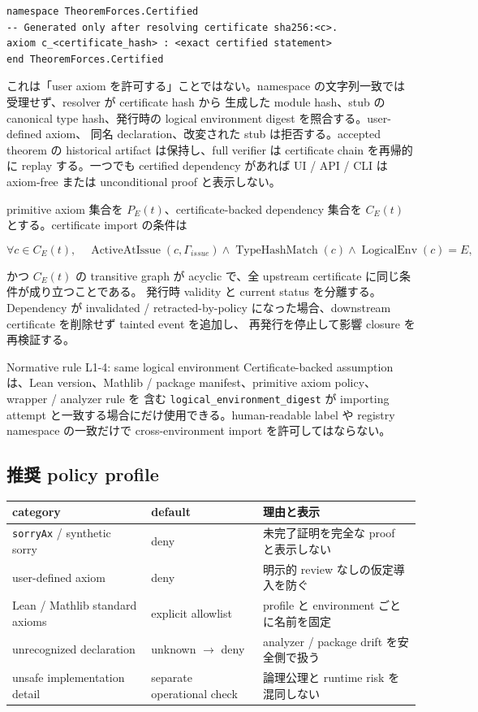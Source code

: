\documentclass[a4paper,11pt]{ltjsarticle}
\newcommand{\code}[1]{\texttt{#1}}
\begin{document}
\begin{lstlisting}
namespace TheoremForces.Certified
-- Generated only after resolving certificate sha256:<c>.
axiom c_<certificate_hash> : <exact certified statement>
end TheoremForces.Certified
\end{lstlisting}

これは「user axiom を許可する」ことではない。namespace の文字列一致では受理せず、resolver が certificate hash から
生成した module hash、stub の canonical type hash、発行時の logical environment digest を照合する。user-defined axiom、
同名 declaration、改変された stub は拒否する。accepted theorem の historical artifact は保持し、full verifier は
certificate chain を再帰的に replay する。一つでも certified dependency があれば UI / API / CLI は axiom-free または
unconditional proof と表示しない。

primitive axiom 集合を $P_E(t)$、certificate-backed dependency 集合を $C_E(t)$ とする。certificate import の条件は

\[
  \forall c\in C_E(t),\quad
  \operatorname{ActiveAtIssue}(c,\Gamma_{issue})\land
  \operatorname{TypeHashMatch}(c)\land
  \operatorname{LogicalEnv}(c)=E,
\]

かつ $C_E(t)$ の transitive graph が acyclic で、全 upstream certificate に同じ条件が成り立つことである。
発行時 validity と current status を分離する。Dependency が invalidated / retracted-by-policy になった場合、downstream certificate を削除せず tainted event を追加し、
再発行を停止して影響 closure を再検証する。

\begin{specbox}{Normative rule L1-4: same logical environment}
Certificate-backed assumption は、Lean version、Mathlib / package manifest、primitive axiom policy、wrapper / analyzer rule を
含む \code{logical\_environment\_digest} が importing attempt と一致する場合にだけ使用できる。human-readable label や
registry namespace の一致だけで cross-environment import を許可してはならない。
\end{specbox}

\subsection{推奨 policy profile}

\begin{tabularx}{\linewidth}{L{34mm}L{30mm}Y}
\toprule
\textbf{category} & \textbf{default} & \textbf{理由と表示} \\
\midrule
\code{sorryAx} / synthetic sorry & deny & 未完了証明を完全な proof と表示しない \\
user-defined axiom & deny & 明示的 review なしの仮定導入を防ぐ \\
Lean / Mathlib standard axioms & explicit allowlist & profile と environment ごとに名前を固定 \\
unrecognized declaration & unknown $\rightarrow$ deny & analyzer / package drift を安全側で扱う \\
unsafe implementation detail & separate operational check & 論理公理と runtime risk を混同しない \\
\bottomrule
\end{tabularx}
\end{document}
